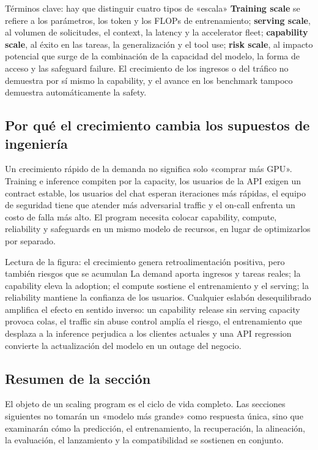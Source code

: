 \begin{knowledgebox}{Términos clave: hay que distinguir cuatro tipos de «escala»}
\textbf{Training scale} se refiere a los parámetros, los token y los FLOPs de entrenamiento; \textbf{serving scale}, al volumen de solicitudes, el context, la latency y la accelerator fleet; \textbf{capability scale}, al éxito en las tareas, la generalización y el tool use; \textbf{risk scale}, al impacto potencial que surge de la combinación de la capacidad del modelo, la forma de acceso y las safeguard failure. El crecimiento de los ingresos o del tráfico no demuestra por sí mismo la capability, y el avance en los benchmark tampoco demuestra automáticamente la safety.
\end{knowledgebox}

\subsection{Por qué el crecimiento cambia los supuestos de ingeniería}

Un crecimiento rápido de la demanda no significa solo «comprar más GPU». Training e inference compiten por la capacity, los usuarios de la API exigen un contract estable, los usuarios del chat esperan iteraciones más rápidas, el equipo de seguridad tiene que atender más adversarial traffic y el on-call enfrenta un costo de falla más alto. El program necesita colocar capability, compute, reliability y safeguards en un mismo modelo de recursos, en lugar de optimizarlos por separado.


\begin{knowledgebox}{Lectura de la figura: el crecimiento genera retroalimentación positiva, pero también riesgos que se acumulan}
La demand aporta ingresos y tareas reales; la capability eleva la adoption; el compute sostiene el entrenamiento y el serving; la reliability mantiene la confianza de los usuarios. Cualquier eslabón desequilibrado amplifica el efecto en sentido inverso: un capability release sin serving capacity provoca colas, el traffic sin abuse control amplía el riesgo, el entrenamiento que desplaza a la inference perjudica a los clientes actuales y una API regression convierte la actualización del modelo en un outage del negocio.
\end{knowledgebox}

\subsection{Resumen de la sección}

El objeto de un scaling program es el ciclo de vida completo. Las secciones siguientes no tomarán un «modelo más grande» como respuesta única, sino que examinarán cómo la predicción, el entrenamiento, la recuperación, la alineación, la evaluación, el lanzamiento y la compatibilidad se sostienen en conjunto.
